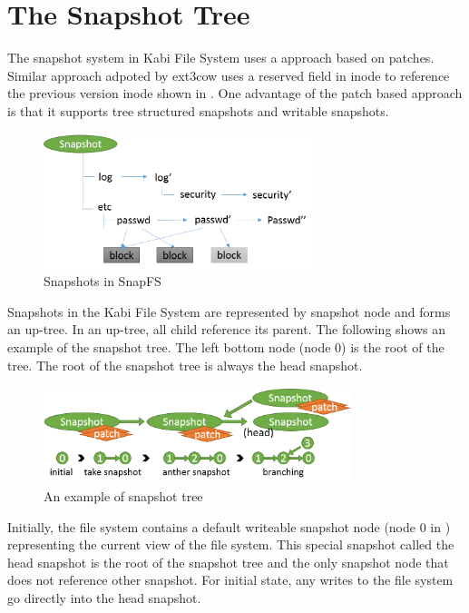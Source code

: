 \section{The Snapshot Tree}

	The snapshot system in Kabi File System uses a approach based on patches. Similar approach adpoted by ext3cow uses a reserved field in inode to reference the previous version inode shown in . One advantage of the patch based approach is that it supports tree structured snapshots and writable snapshots.

\begin{figure}[hbtp]
\centering
\includegraphics[width=0.7\textwidth]{Chapter-4/figs/fig24.png}
\caption{Snapshots in SnapFS}
\label{fig:snapfs_approach}
\end{figure}

    Snapshots in the Kabi File System are represented by snapshot node and forms an up-tree. In an up-tree, all child reference its parent. The following  shows an example of the snapshot tree. The left bottom node (node 0) is the root of the tree. The root of the snapshot tree is always the head snapshot.

\begin{figure}[hbtp]
\centering
\includegraphics[width=0.8\textwidth]{Chapter-4/figs/fig13.png}
\caption{An example of snapshot tree}
\label{fig:snap_tree_example}
\end{figure}

    Initially, the file system contains a default writeable snapshot node (node 0 in ) representing the current view of the file system. This special snapshot called the head snapshot is the root of the snapshot tree and the only snapshot node that does not reference other snapshot. For initial state, any writes to the file system go directly into the head snapshot.
    
